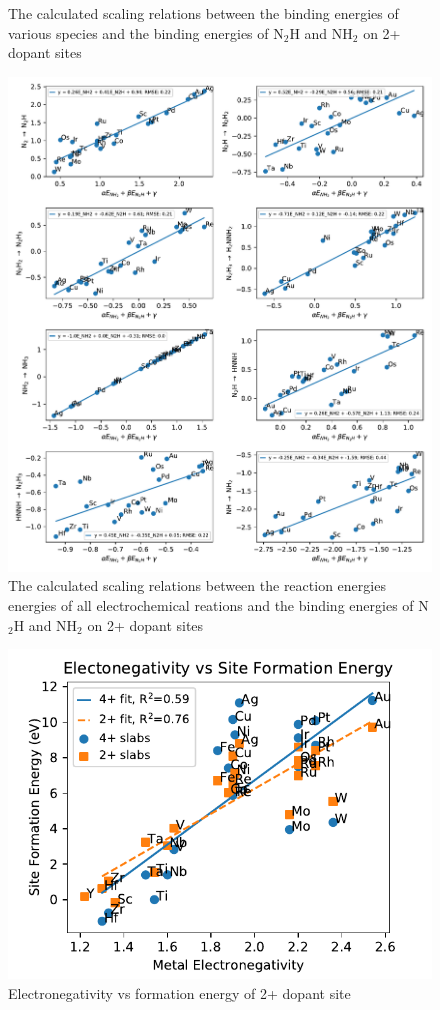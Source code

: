 \documentclass[journal=jacsat,manuscript=article]{achemso}
\begin{document}
\begin{figure}
\caption{The calculated scaling relations between the binding energies of various species and the binding energies of N$_2$H and NH$_2$ on 2+ dopant sites}
\label{fig:scaling_species}
\end{figure}

\begin{figure}
\centering
\includegraphics[width=0.8\linewidth]{Images/scaling_reactions.pdf}
\caption{The calculated scaling relations between the reaction energies energies of all electrochemical reations and the binding energies of N$_2$H and NH$_2$ on 2+ dopant sites}
\label{fig:scaling_reactions}
\end{figure}

\twocolumn

\begin{figure}
\centering
\includegraphics[width=0.8\linewidth]{Images/electronegativity_vs_formation.pdf}
\caption{Electronegativity vs formation energy of 2+ dopant site}
\label{fig:electronegativity}
\end{figure}
\end{document}
